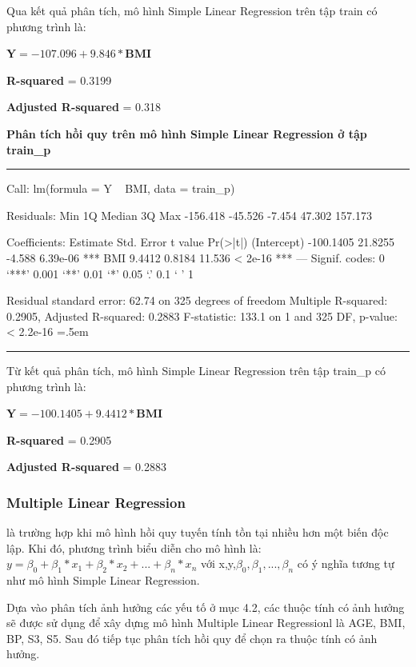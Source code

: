 \documentclass[runningheads]{llncs}
\newenvironment{lcverbatim}
 {\SaveVerbatim{cverb}}
 {\endSaveVerbatim
  \flushleft\fboxrule=0pt\fboxsep=.5em
  \colorbox{cverbbg}{%
    \makebox[\dimexpr\linewidth-2\fboxsep][l]{\BUseVerbatim{cverb}}%
  }
  \endflushleft
}
\begin{document}
Qua kết quả phân tích, mô hình Simple Linear Regression trên tập train có phương trình là:
\begin{center}
	$\textbf{Y}=  -107.096 + 9.846*\textbf{BMI}$
\end{center}

\textbf{R-squared} = 0.3199

\textbf{Adjusted R-squared} = 0.318

\vspace{0.5cm}
\textbf{Phân tích hồi quy trên mô hình Simple Linear Regression ở tập train\_p}
\vspace{0.5cm}
\hrule
\begin{lcverbatim}
Call:
lm(formula = Y ~ BMI, data = train_p)

Residuals:
     Min       1Q   Median       3Q      Max 
-156.418  -45.526   -7.454   47.302  157.173 

Coefficients:
             Estimate Std. Error t value Pr(>|t|)    
(Intercept) -100.1405    21.8255  -4.588 6.39e-06 ***
BMI            9.4412     0.8184  11.536  < 2e-16 ***
---
Signif. codes:  0 ‘***’ 0.001 ‘**’ 0.01 ‘*’ 0.05 ‘.’ 0.1 ‘ ’ 1

Residual standard error: 62.74 on 325 degrees of freedom
Multiple R-squared:  0.2905,	Adjusted R-squared:  0.2883 
F-statistic: 133.1 on 1 and 325 DF,  p-value: < 2.2e-16
\end{lcverbatim}
\hrule
\vspace{0.5cm}

Từ kết quả phân tích, mô hình Simple Linear Regression trên tập train\_p có phương trình là:
\begin{center}
	$\textbf{Y}=  -100.1405 + 9.4412*\textbf{BMI}$
\end{center}

\textbf{R-squared} = 0.2905 

\textbf{Adjusted R-squared} = 0.2883

\subsubsection{Multiple Linear Regression} là trường hợp khi mô hình hồi quy tuyến tính tồn tại nhiều hơn một biến độc lập. Khi đó, phương trình biểu diễn cho mô hình là: $y= \beta_0 +\beta_1*x_1+\beta_2*x_2+...+\beta_n*x_n$ với x,y,$\beta_0, \beta_1,...,\beta_n$ có ý nghĩa tương tự như mô hình Simple Linear Regression.

Dựa vào phân tích ảnh hưởng các yếu tố ở mục 4.2, các thuộc tính có ảnh hưởng sẽ được sử dụng để xây dựng mô hình Multiple Linear Regressionl là AGE, BMI, BP, S3, S5. Sau đó tiếp tục phân tích hồi quy để chọn ra thuộc tính có ảnh hưởng.
\end{document}
